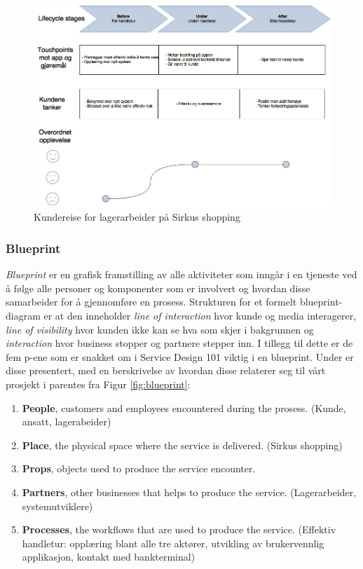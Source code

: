\begin{figure}[H]
\includegraphics[scale=0.49]{images/customerjourneyBlueprint/cjLager}
\centering %
\caption{Kundereise for lagerarbeider på Sirkus shopping}
\label{fig:customerLager}
\end{figure}

\subsubsection{Blueprint}
\label{sec:blueprint}
\textit{Blueprint} er en grafisk framstilling av alle aktiviteter som inngår i en tjeneste ved å følge alle personer og komponenter som er involvert og hvordan disse samarbeider for å gjennomføre en prosess\cite{servicedesign}.
Strukturen for et formelt blueprint-diagram er at den inneholder \textit{line of interaction} hvor kunde og media interagerer, \textit{line of visibility} hvor kunden ikke kan se hva som skjer i bakgrunnen og \textit{interaction} hvor business stopper og partnere stepper inn\cite{servicedesign}. I tillegg til dette er de fem p-ene som er snakket om i Service Design 101\cite{101} viktig i en blueprint\cite{servicedesign}. Under er disse presentert, med en berskrivelse av hvordan disse relaterer seg til vårt prosjekt i parentes fra Figur \ref{fig:blueprint}:

\begin{enumerate}
\item \textbf{People}, customers and employees encountered during the prosess. (Kunde, ansatt, lagerabeider)
\item \textbf{Place}, the physical space where the service is delivered. (Sirkus shopping)
\item \textbf{Props}, objects used to produce the service encounter.
\item \textbf{Partners}, other businesses that helps to produce the service.  (Lagerarbeider, systemutviklere)
\item \textbf{Processes}, the workflows that are used to produce the service.  (Effektiv handletur: opplæring blant alle tre aktører, utvikling av brukervennlig applikasjon, kontakt med bankterminal)
\end{enumerate} 

